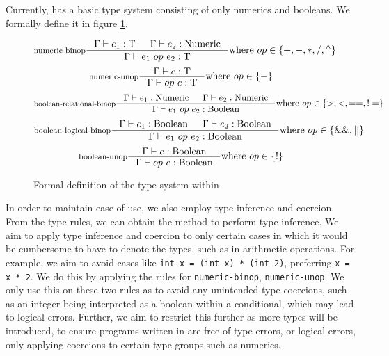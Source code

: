Currently, \rimp has a basic type system consisting of only numerics and booleans. 
We formally define it in figure \ref{fig:type-system}.
\begin{figure}[hbt!]
    \centering
    \[
        \inference[numeric-binop]{
        \Gamma \vdash e_1 : \text{T} & \Gamma \vdash e_2 : \text{Numeric} 
        }{
        \Gamma \vdash e_1\ op\ e_2 : \text{T}
        }
        \text{where } op\in \{+, -, *, /, {}^\land\}
    \]
    \vspace{0.1cm}
    \[
        \inference[numeric-unop]{
        \Gamma \vdash e : \text{T}
        }{
        \Gamma \vdash op\ e : \text{T}
        } \text{where } op\in \{-\}
    \]
    \vspace{0.1cm}
    \[
        \inference[boolean-relational-binop]{
        \Gamma \vdash e_1 : \text{Numeric} & \Gamma \vdash e_2 : \text{Numeric} 
        }{
        \Gamma \vdash e_1\ op\ e_2 : \text{Boolean}
        } \text{where } op\in \{>, <, ==, !=\}
    \]
    \vspace{0.1cm}
    \[
        \inference[boolean-logical-binop]{
        \Gamma \vdash e_1 : \text{Boolean} & \Gamma \vdash e_2 : \text{Boolean} 
        }{
        \Gamma \vdash e_1\ op\ e_2 : \text{Boolean}
        } \text{where } op\in \{\&\&, ||\}
    \]
    \vspace{0.1cm}
    \[
        \inference[boolean-unop]{
        \Gamma \vdash e : \text{Boolean} 
        }{
        \Gamma \vdash op\ e : \text{Boolean}
        } \text{where } op\in \{!\}
    \]
    \caption{Formal definition of the type system within \rimp}
    \label{fig:type-system}
\end{figure}

In order to maintain ease of use, we also employ type inference and coercion. From the type rules, we can obtain the method to perform type inference. We aim to apply type inference and coercion to only certain cases in which it would be cumbersome to have to denote the types, such as in arithmetic operations. For example, we aim to avoid cases like \lstinline{int x = (int x) * (int 2)}, preferring \lstinline{x = x * 2}.
We do this by applying the rules for \lstinline{numeric-binop}, \lstinline{numeric-unop}. We only use this on these two rules as to avoid any unintended type coercions, such as an integer being interpreted as a boolean within a conditional, which may lead to logical errors. Further, we aim to restrict this further as more types will be introduced, to ensure programs written in \rimp are free of type errors, or logical errors, only applying coercions to certain type groups such as numerics.

